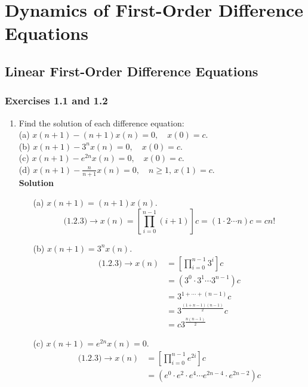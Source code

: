 \chapter{Dynamics of First-Order Difference Equations}
\section{Linear First-Order Difference Equations}
\subsection{Exercises 1.1 and 1.2}
\begin{enumerate}
    \item Find the solution of each difference equation: \\
        (a) $x(n+1)-(n+1)x(n)=0,\quad x(0)=c.$ \\
        (b) $x(n+1)-3^n x(n)=0,\quad x(0)=c.$ \\
        (c) $x(n+1)-e^{2n}x(n)=0,\quad x(0)=c.$ \\
        (d) $x(n+1)-\frac{n}{n+1}x(n)=0,\quad n\geq 1,\,x(1)=c.$ \\
        \textbf{Solution}
        \begin{itemize}
            \item[(a)] $x(n+1)=(n+1)x(n).$
                $$
                    \text{(1.2.3)}\to
                    x(n)=\left[\prod_{i=0}^{n-1}(i+1)\right]c
                    =(1\cdot 2\cdots n)c=cn!
                $$
            \item[(b)] $x(n+1)=3^n x(n).$
                \begin{align*}
                    \text{(1.2.3)}\to x(n) & =\left[\prod_{i=0}^{n-1}3^i\right]c \\
                                           & =(3^0\cdot 3^1\cdots 3^{n-1})c \\
                                           & =3^{1+\cdots+(n-1)}c \\
                                           & =3^{\frac{(1+n-1)(n-1)}{2}}c \\
                                           & =c3^{\frac{n(n-1)}{2}}
                \end{align*}
            \item[(c)] $x(n+1)=e^{2n}x(n)=0.$
                \begin{align*}
                    \text{(1.2.3)}\to x(n) & =\left[\prod_{i=0}^{n-1}e^{2i}\right]c \\
                                           & =(e^0\cdot e^2\cdot e^4\cdots e^{2n-4}\cdot e^{2n-2})c \\

\end{align*}
\end{itemize}
\end{enumerate}
